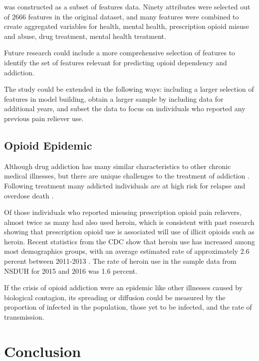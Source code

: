 \documentclass[sigconf]{acmart}
\begin{document}
was constructed as a subset of 
features data. 
Ninety attributes were selected out of 2666 features in the original dataset, 
and many features were combined to create aggregated variables for health, 
mental health, prescription opioid misuse and abuse, drug treatment, mental health
treatment. 

Future research could include a more comprehensive selection of
features to identify the set of features relevant for predicting opioid
dependency and addiction. 

The study could be extended in the following ways: including a larger
selection of features in model building, obtain a larger sample by including 
data for additional years, and subset the data to focus on individuals who 
reported any previous pain reliever use. 



\subsection{Opioid Epidemic}

Although drug addiction has many similar characteristics 
to other chronic medical illnesses, but there are unique challenges to the 
treatment of addiction \cite{marsch12, swendson16}. 
Following treatment many addicted individuals are at high 
risk for relapse and overdose death \cite{shaham03}.

Of those individuals who reported misusing prescription opioid pain relievers, 
almost twice as many had also used heroin, which is  consistent with past
research showing that prescription opioid use is associated will use of illicit 
opioids such as heroin. Recent statistics from the CDC show that heroin use has 
increased among most demographics groups, with an average estimated rate  of 
approximately 2.6 percent between 2011-2013 \cite{cdc16}. The rate of heroin use
in the sample data from NSDUH for 2015 and 2016 was 1.6 percent. 

If the crisis of opioid addiction were an epidemic like other illnesses caused 
by biological contagion, its spreading or diffusion could be measured by the 
proportion of infected in the population, those yet to be infected, and the 
rate of transmission. 

\section{Conclusion}
\end{document}
